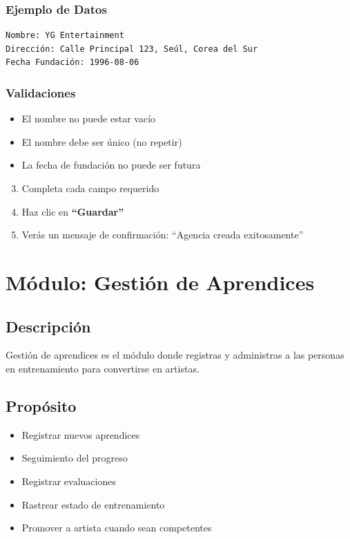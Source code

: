 \documentclass[12pt,a4paper,spanish,oneside]{report}
\begin{document}
\subsection{Ejemplo de Datos}

\begin{verbatim}
Nombre: YG Entertainment
Dirección: Calle Principal 123, Seúl, Corea del Sur
Fecha Fundación: 1996-08-06
\end{verbatim}

\subsection{Validaciones}

\begin{itemize}
    \item El nombre no puede estar vacío
    \item El nombre debe ser único (no repetir)
    \item La fecha de fundación no puede ser futura
\end{itemize}

\begin{enumerate}
    \setcounter{enumi}{2}
    \item Completa cada campo requerido
    \item Haz clic en \textbf{``Guardar''}
    \item Verás un mensaje de confirmación: ``Agencia creada exitosamente''
\end{enumerate}

\chapter{Módulo: Gestión de Aprendices}

\section{Descripción}

Gestión de aprendices es el módulo donde registras y administras a las personas en entrenamiento para convertirse en artistas.

\section{Propósito}

\begin{itemize}
    \item Registrar nuevos aprendices
    \item Seguimiento del progreso
    \item Registrar evaluaciones
    \item Rastrear estado de entrenamiento
    \item Promover a artista cuando sean competentes
\end{itemize}
\end{document}
